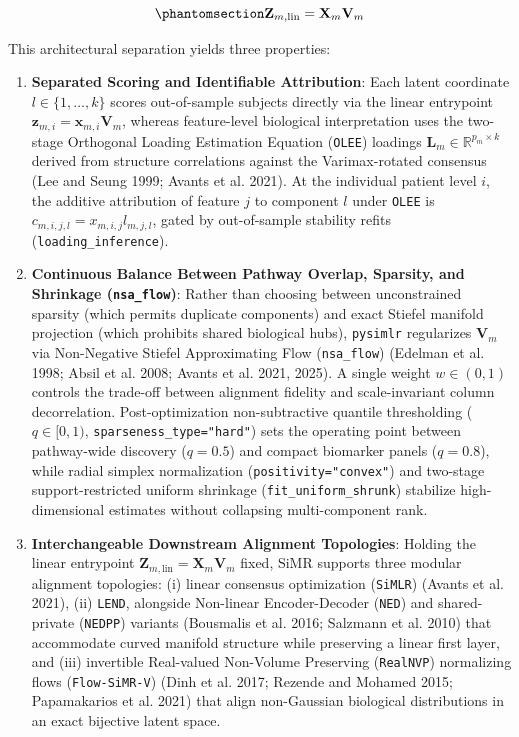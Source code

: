 \documentclass[
  10pt,
  letterpaper,
]{report}
\providecommand{\tightlist}{%
  \setlength{\itemsep}{0pt}\setlength{\parskip}{0pt}}
\begin{document}
\begin{equation}\protect\phantomsection\label{eq-linear-entrypoint}{
\mathbf{Z}_{m,\text{lin}} = \mathbf{X}_m \mathbf{V}_m
}\end{equation}

This architectural separation yields three properties:

\begin{enumerate}
\def\labelenumi{\arabic{enumi}.}
\tightlist
\item
  \textbf{Separated Scoring and Identifiable Attribution}: Each latent
  coordinate \(l \in \{1, \dots, k\}\) scores out-of-sample subjects
  directly via the linear entrypoint
  \(\mathbf{z}_{m,i} = \mathbf{x}_{m,i}\mathbf{V}_m\), whereas
  feature-level biological interpretation uses the two-stage Orthogonal
  Loading Estimation Equation (\texttt{OLEE}) loadings
  \(\mathbf{L}_m \in \mathbb{R}^{p_m \times k}\) derived from structure
  correlations against the Varimax-rotated consensus (Lee and Seung
  1999; Avants et al. 2021). At the individual patient level \(i\), the
  additive attribution of feature \(j\) to component \(l\) under
  \texttt{OLEE} is \(c_{m,i,j,l} = x_{m,i,j} l_{m,j,l}\), gated by
  out-of-sample stability refits (\texttt{loading\_inference}).
\item
  \textbf{Continuous Balance Between Pathway Overlap, Sparsity, and
  Shrinkage (\texttt{nsa\_flow})}: Rather than choosing between
  unconstrained sparsity (which permits duplicate components) and exact
  Stiefel manifold projection (which prohibits shared biological hubs),
  \texttt{pysimlr} regularizes \(\mathbf{V}_m\) via Non-Negative Stiefel
  Approximating Flow (\texttt{nsa\_flow}) (Edelman et al. 1998; Absil et
  al. 2008; Avants et al. 2021, 2025). A single weight \(w \in (0,1)\)
  controls the trade-off between alignment fidelity and scale-invariant
  column decorrelation. Post-optimization non-subtractive quantile
  thresholding (\(q \in [0, 1)\), \texttt{sparseness\_type="hard"}) sets
  the operating point between pathway-wide discovery (\(q = 0.5\)) and
  compact biomarker panels (\(q = 0.8\)), while radial simplex
  normalization (\texttt{positivity="convex"}) and two-stage
  support-restricted uniform shrinkage (\texttt{fit\_uniform\_shrunk})
  stabilize high-dimensional estimates without collapsing
  multi-component rank.
\item
  \textbf{Interchangeable Downstream Alignment Topologies}: Holding the
  linear entrypoint
  \(\mathbf{Z}_{m,\text{lin}} = \mathbf{X}_m \mathbf{V}_m\) fixed, SiMR
  supports three modular alignment topologies: (i) linear consensus
  optimization (\texttt{SiMLR}) (Avants et al. 2021), (ii)
  \texttt{LEND}, alongside Non-linear Encoder-Decoder (\texttt{NED}) and
  shared-private (\texttt{NEDPP}) variants (Bousmalis et al. 2016;
  Salzmann et al. 2010) that accommodate curved manifold structure while
  preserving a linear first layer, and (iii) invertible Real-valued
  Non-Volume Preserving (\texttt{RealNVP}) normalizing flows
  (\texttt{Flow-SiMR-V}) (Dinh et al. 2017; Rezende and Mohamed 2015;
  Papamakarios et al. 2021) that align non-Gaussian biological
  distributions in an exact bijective latent space.
\end{enumerate}
\end{document}
